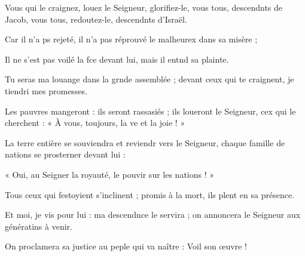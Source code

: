 \item Vous qui le craignez, louez le Seigneur,\pscross{} glorifiez-le, vous tous, descendnts de Jacob,\psstar{} vous tous, redoutez-le, descendnts d’Israël.
\item Car il n’a ps rejeté,\psstar{} il n’a pas réprouvé le malheurex dans sa misère ;
\item Il ne s’est pas voilé la fce devant lui,\psstar{} mais il entnd sa plainte.
\item Tu seras ma louange dans la grnde assemblée ;\psstar{} devant ceux qui te craignent, je tiendri mes promesses.
\item Les pauvres mangeront : ils seront rassasiés ;\pscross{} ils loueront le Seigneur, cex qui le cherchent :\psstar{} « À vous, toujours, la ve et la joie ! »
\item La terre entière se souviendra et reviendr vers le Seigneur,\psstar{} chaque famille de nations se prosterner devant lui :
\item « Oui, au Seigner la royauté,\psstar{} le pouvir sur les nations ! »
\item Tous ceux qui festoyient s’inclinent ;\psstar{} promis à la mort, ils plent en sa présence.
\item Et moi, je vis pour lui : ma descendnce le servira ;\psstar{} on annoncera le Seigneur aux génératins à venir.
\item On proclamera sa justice au peple qui va naître :\psstar{} Voil son œuvre !